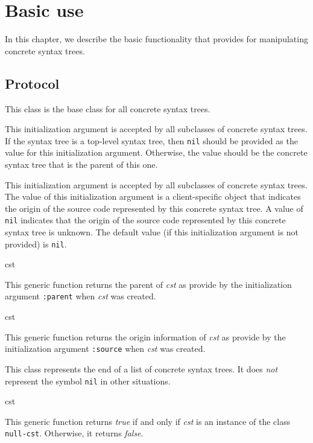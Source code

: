 \chapter{Basic use}

In this chapter, we describe the basic functionality that \sysname{}
provides for manipulating concrete syntax trees.

\section{Protocol}


This class is the base class for all concrete syntax trees.


This initialization argument is accepted by all subclasses of concrete
syntax trees.  If the syntax tree is a top-level syntax tree, then
\texttt{nil} should be provided as the value for this initialization
argument.  Otherwise, the value should be the concrete syntax tree
that is the parent of this one.


This initialization argument is accepted by all subclasses of concrete
syntax trees.  The value of this initialization argument is a
client-specific object that indicates the origin of the source code
represented by this concrete syntax tree.  A value of \texttt{nil}
indicates that the origin of the source code represented by this concrete
syntax tree is unknown.  The default value (if this initialization
argument is not provided) is \texttt{nil}.

 {cst}

This generic function returns the parent of \textit{cst} as provide by
the initialization argument \texttt{:parent} when \textit{cst} was
created.

 {cst}

This generic function returns the origin information of \textit{cst}
as provide by the initialization argument \texttt{:source} when
\textit{cst} was created.


This class represents the end of a list of concrete syntax trees.  It
does \emph{not} represent the \commonlisp{} symbol \texttt{nil} in
other situations.

 {cst}

This generic function returns \emph{true} if and only if \textit{cst}
is an instance of the class \texttt{null-cst}.  Otherwise, it returns
\emph{false}.

